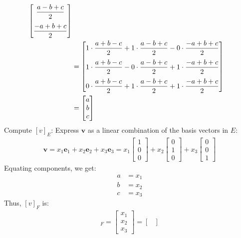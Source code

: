 \begin{enumerate}
\begin{enumerate}[label={(\alph*)}]
\begin{align}
\begin{bmatrix}
    \displaystyle\frac{a - b + c}{2} \\[10pt]
    \displaystyle\frac{-a + b + c}{2}
    \end{bmatrix} \notag\\
    &= \begin{bmatrix}
    \displaystyle1\cdot \frac{a + b - c}{2} + \displaystyle1\cdot \frac{a - b + c}{2} - \displaystyle0\cdot \frac{-a + b + c}{2} \\[10pt]
    \displaystyle1\cdot \frac{a + b - c}{2} - \displaystyle0\cdot \frac{a - b + c}{2} + \displaystyle1\cdot \frac{-a + b + c}{2} \\[10pt]
    \displaystyle0\cdot \frac{a + b - c}{2} +\displaystyle1 \cdot \frac{a - b + c}{2} + \displaystyle1 \cdot \frac{-a + b + c}{2}
    \end{bmatrix} \notag\\
    &= \begin{bmatrix}
    a \\
    b \\
    c
    \end{bmatrix}\label{eq:P[v]_E-eqn}
\end{align}
Compute $[v]_E$: Express $\mathbf{v}$ as a linear combination of the basis vectors in $E$:
\begin{align}
    \mathbf{v} = x_1 \mathbf{e}_1 + x_2 \mathbf{e}_2 + x_3 \mathbf{e}_3 = x_1 \begin{bmatrix} 1 \\ 0 \\ 0 \end{bmatrix} + x_2 \begin{bmatrix} 0 \\ 1 \\ 0 \end{bmatrix} + x_3 \begin{bmatrix} 0 \\ 0 \\ 1 \end{bmatrix}
\end{align}
Equating components, we get:
\begin{align*}
    a &= x_1 \\
    b &= x_2 \\
    c &= x_3
\end{align*}
Thus, $[v]_F$ is:
\begin{align}
    [v]_F = \begin{bmatrix}
    x_1 \\
    x_2 \\
    x_3
    \end{bmatrix} = \begin{bmatrix}

\end{bmatrix}
\end{align}
\end{enumerate}
\end{enumerate}
